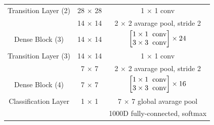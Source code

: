 \begin{table}[!h]
\begin{tabular}{|c|c|c|}
                    \hline
                    \rule[-3mm]{0mm}{8mm}
                    Transition Layer (2) & 28 $\times$ 28 & 1 $\times$ 1 conv \\
                    \cline{2-3}
                    \rule[-3mm]{0mm}{8mm}
                    & 14 $\times$ 14 & 2 $\times$ 2 avarage pool, stride 2\\
                    \hline 
                    \rule[-6mm]{0mm}{1.4cm}
                    Dense Block  (3) & 14 $\times$ 14 & $\begin{bmatrix} 1 \times 1  \hspace{.2cm} \text{conv}\\ 3 \times 3 \hspace{.2cm} \text{conv} \end{bmatrix} \times 24 $ \\
                    \hline
                    \rule[-3mm]{0mm}{8mm}
                    Transition Layer (3) & 14 $\times$ 14 & 1 $\times$ 1 conv \\
                    \cline{2-3}
                    \rule[-3mm]{0mm}{8mm}
                    & 7 $\times$ 7 & 2 $\times$ 2 avarage pool, stride 2\\
                    \hline 
                    \rule[-6mm]{0mm}{1.4cm}
                    Dense Block  (4) & 7 $\times$ 7 & $\begin{bmatrix} 1 \times 1  \hspace{.2cm} \text{conv}\\ 3 \times 3 \hspace{.2cm} \text{conv} \end{bmatrix} \times 16 $ \\
                    \hline
                    \rule[-3mm]{0mm}{8mm}
                    Classification Layer & 1 $\times$ 1 & 7 $\times$ 7 global avarage pool \\
                    \cline{2-3}
                    \rule[-3mm]{0mm}{8mm}
                    &  & 1000D fully-connected, softmax\\
                    \hline
                \end{tabular}
                \label{DenseNet121 Architecture}
            \end{table}
        
        \newpage
        
